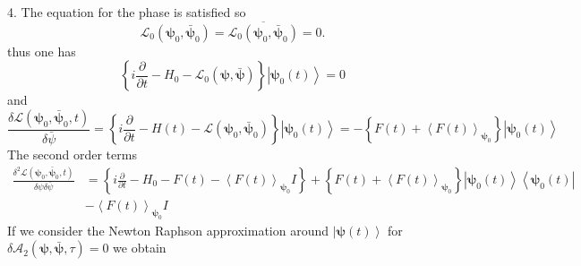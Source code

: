 \documentclass[aps,preprint]{revtex4}%
\begin{document}
4. The equation for the phase is satisfied so
\begin{equation}
\mathcal{L}_{0}\left(  \mathbf{\psi}_{0},\mathbf{\bar{\psi}}_{0}\right)
=\overline{\mathcal{L}_{0}\left(  \mathbf{\psi}_{0},\mathbf{\bar{\psi}}%
_{0}\right)  }=0.
\end{equation}
thus one has
\begin{equation}
\left\{  i\frac{\partial}{\partial t}-H_{0}-\mathcal{L}_{0}\left(
\mathbf{\psi},\mathbf{\bar{\psi}}\right)  \right\}  \left\vert \mathbf{\psi
}_{0}\left(  t\right)  \right\rangle =0
\end{equation}
and
\begin{equation}
\frac{\delta\mathcal{L}\left(  \mathbf{\psi}_{0},\mathbf{\bar{\psi}}%
_{0}\mathbf{,}t\right)  }{\delta\bar{\psi}}=\left\{  i\frac{\partial}{\partial
t}-H\left(  t\right)  -\mathcal{L}\left(  \mathbf{\psi}_{0},\mathbf{\bar{\psi
}}_{0}\right)  \right\}  \left\vert \mathbf{\psi}_{0}\left(  t\right)
\right\rangle =-\left\{  F\left(  t\right)  +\left\langle F\left(  t\right)
\right\rangle _{\mathbf{\psi}_{0}}\right\}  \left\vert \mathbf{\psi}%
_{0}\left(  t\right)  \right\rangle
\end{equation}
The second order terms
\begin{align}
\frac{\delta^{2}\mathcal{L}\left(  \mathbf{\psi}_{0},\mathbf{\bar{\psi}}%
_{0}\mathbf{,}t\right)  }{\delta\psi\delta\bar{\psi}}  & =\left\{
i\frac{\partial}{\partial t}-H_{0}-F\left(  t\right)  -\left\langle F\left(
t\right)  \right\rangle _{\mathbf{\psi}_{0}}I\right\}  +\left\{  F\left(
t\right)  +\left\langle F\left(  t\right)  \right\rangle _{\mathbf{\psi}_{0}%
}\right\}  \left\vert \mathbf{\psi}_{0}\left(  t\right)  \right\rangle
\left\langle \mathbf{\psi}_{0}\left(  t\right)  \right\vert \\
& -\left\langle F\left(  t\right)  \right\rangle _{\mathbf{\psi}_{0}}I
\end{align}
If we consider the Newton Raphson approximation around $\left\vert
\mathbf{\psi}\left(  t\right)  \right\rangle $ for $\delta\mathcal{A}%
_{2}\left(  \mathbf{\psi},\mathbf{\bar{\psi},}\tau\right)  =0$ we obtain
\end{document}
